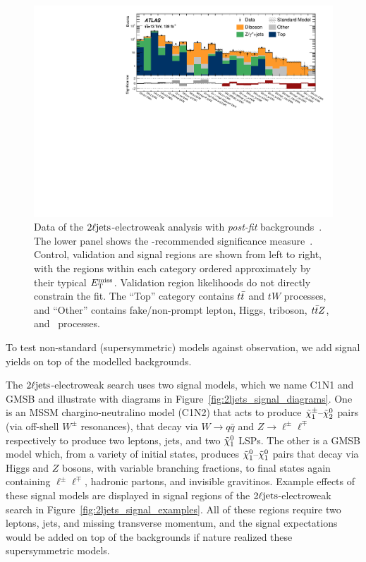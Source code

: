 \begin{figure}[tp]
\centering
\includegraphics[width=\textwidth]{figures/2ljets_summary_log.pdf}
\caption[
Data of the $\twoljets$-electroweak analysis with \emph{post-fit}
backgrounds
]{%
Data of the $\twoljets$-electroweak analysis with \emph{post-fit}
backgrounds~\cite{atlas2022searches}.
The lower panel shows the \atlas-recommended significance
measure~\cite{atlas_significance}.
Control, validation and signal regions are shown from left to right, with the
regions within each category ordered approximately by their typical $E_\mathrm{T}^\mathrm{miss}$.
Validation region likelihoods do not directly constrain the fit.
The ``Top'' category contains $t\bar t$ and $tW$ processes, and
``Other'' contains fake/non-prompt lepton, Higgs, triboson, $t\bar t Z$, and
\topother\ processes.%
}
\label{fig:2ljets_summary}
\end{figure}

To test non-standard (supersymmetric) models against observation,
we add signal yields on top of the modelled backgrounds.

The $\twoljets$-electroweak search uses two signal models,
which we name C1N1 and GMSB and illustrate with diagrams in
Figure~\ref{fig:2ljets_signal_diagrams}.
One is an MSSM chargino-neutralino model (C1N2) that acts to produce
$\tilde\chi^\pm_1\textrm{--}\tilde\chi^0_2$ pairs (via off-shell $W^\pm$ resonances),
that decay via $W\to q\bar q$ and $Z\to \ell^\pm \ell^\mp$
respectively to produce two leptons, jets, and two $\tilde\chi^0_1$ LSPs.
The other is a GMSB model which, from a variety of initial states, produces
$\tilde\chi^0_1\textrm{--}\tilde\chi^0_1$ pairs that decay via Higgs and $Z$
bosons, with variable branching fractions,
to final states again containing $\ell^\pm \ell^\mp$, hadronic partons,
and invisible gravitinos.
Example effects of these signal models are displayed in signal regions of the
$\twoljets$-electroweak search in
Figure~\ref{fig:2ljets_signal_examples}.
All of these regions require two leptons, jets, and
missing transverse momentum, and the signal expectations would be added on top
of the backgrounds if nature realized these supersymmetric models.

